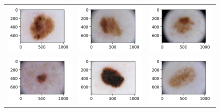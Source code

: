 \begin{figure}[!b]
\begin{tabular}{ccc}
        \includegraphics[width=4cm]{../Plots/THR/sample_6.png} &
        \includegraphics[width=4cm]{../Plots/THR/sample_7.png} &
        \includegraphics[width=4cm]{../Plots/THR/sample_8.png} \\

        \includegraphics[width=4cm]{../Plots/THR/sample_9.png} &
        \includegraphics[width=4cm]{../Plots/THR/sample_10.png} &
        \includegraphics[width=4cm]{../Plots/THR/sample_11.png} \\


\end{tabular}
\end{figure}
